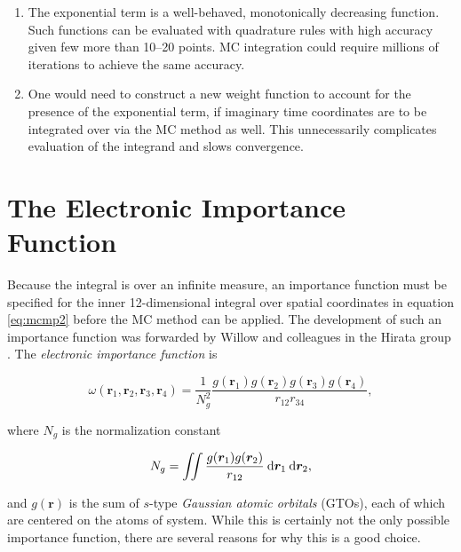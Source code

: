 \begin{enumerate}

\item The exponential term is a well-behaved, monotonically decreasing function.
	Such functions can be evaluated with quadrature rules with high accuracy
	given few more than 10--20 points. MC integration could require millions
	of iterations to achieve the same accuracy.

\item One would need to construct a new weight function to account for the
	presence of the exponential term, if imaginary time coordinates are to
	be integrated over via the MC method as well. This unnecessarily
	complicates evaluation of the integrand and slows convergence.

\end{enumerate}

\section{The Electronic Importance Function}
\label{s:elec-imp}

Because the integral is over an infinite measure, an importance function must be
specified for the inner 12-dimensional integral over spatial coordinates in
equation \ref{eq:mcmp2} before the MC method can be applied. The development of
such an importance function was forwarded by Willow and colleagues in the Hirata
group \cite{willow1, willow2}. The \emph{electronic importance function} is

\begin{equation}
\omega(\bm r_1, \bm r_2, \bm r_3, \bm r_4)
=
\frac{1}{N_g^2} \frac{g(\bm r_1) g(\bm r_2) g(\bm r_3) g(\bm r_4)}{r_{12}r_{34}}
,
\label{eq:imp}
\end{equation}

\noindent where $N_g$ is the normalization constant

\begin{equation}
N_g
=
\iint \frac{g(\bm r_1) g(\bm r_2)}{r_{12}} \:\mathrm{d}\bm r_1 \:\mathrm{d}\bm r_2,
\end{equation}

\noindent and $g(\bm r)$ is the sum of $s$-type \emph{Gaussian atomic orbitals}
(GTOs), each of which are centered on the atoms of system. While this is
certainly not the only possible importance function, there are several reasons
for why this is a good choice.

